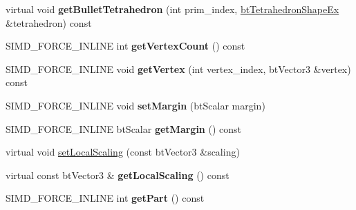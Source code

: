 \begin{DoxyCompactItemize}
\item 
\hypertarget{classbt_g_impact_mesh_shape_part_a4fb1cad47ca10416cd0bc92219ae5f40}{virtual void {\bfseries get\+Bullet\+Tetrahedron} (int prim\+\_\+index, \hyperlink{classbt_tetrahedron_shape_ex}{bt\+Tetrahedron\+Shape\+Ex} \&tetrahedron) const }\label{classbt_g_impact_mesh_shape_part_a4fb1cad47ca10416cd0bc92219ae5f40}

\item 
\hypertarget{classbt_g_impact_mesh_shape_part_ae0dc5c064b20572ad5493cf345f86ad3}{S\+I\+M\+D\+\_\+\+F\+O\+R\+C\+E\+\_\+\+I\+N\+L\+I\+N\+E int {\bfseries get\+Vertex\+Count} () const }\label{classbt_g_impact_mesh_shape_part_ae0dc5c064b20572ad5493cf345f86ad3}

\item 
\hypertarget{classbt_g_impact_mesh_shape_part_aa0bea11142fee03044d30b49ad2325a3}{S\+I\+M\+D\+\_\+\+F\+O\+R\+C\+E\+\_\+\+I\+N\+L\+I\+N\+E void {\bfseries get\+Vertex} (int vertex\+\_\+index, bt\+Vector3 \&vertex) const }\label{classbt_g_impact_mesh_shape_part_aa0bea11142fee03044d30b49ad2325a3}

\item 
\hypertarget{classbt_g_impact_mesh_shape_part_a6f77efd41c832e436bfd6cca7d3269e7}{S\+I\+M\+D\+\_\+\+F\+O\+R\+C\+E\+\_\+\+I\+N\+L\+I\+N\+E void {\bfseries set\+Margin} (bt\+Scalar margin)}\label{classbt_g_impact_mesh_shape_part_a6f77efd41c832e436bfd6cca7d3269e7}

\item 
\hypertarget{classbt_g_impact_mesh_shape_part_abead32520efa9069a612ab91679a7fd4}{S\+I\+M\+D\+\_\+\+F\+O\+R\+C\+E\+\_\+\+I\+N\+L\+I\+N\+E bt\+Scalar {\bfseries get\+Margin} () const }\label{classbt_g_impact_mesh_shape_part_abead32520efa9069a612ab91679a7fd4}

\item 
virtual void \hyperlink{classbt_g_impact_mesh_shape_part_a2c1de297d020a75e1ab0f10f7c71478f}{set\+Local\+Scaling} (const bt\+Vector3 \&scaling)
\item 
\hypertarget{classbt_g_impact_mesh_shape_part_afa7f94f7d157bbd00f388312a19d221d}{virtual const bt\+Vector3 \& {\bfseries get\+Local\+Scaling} () const }\label{classbt_g_impact_mesh_shape_part_afa7f94f7d157bbd00f388312a19d221d}

\item 
\hypertarget{classbt_g_impact_mesh_shape_part_ae0e341fef60714d8151a6c365a44815a}{S\+I\+M\+D\+\_\+\+F\+O\+R\+C\+E\+\_\+\+I\+N\+L\+I\+N\+E int {\bfseries get\+Part} () const }\label{classbt_g_impact_mesh_shape_part_ae0e341fef60714d8151a6c365a44815a}


\end{DoxyCompactItemize}
